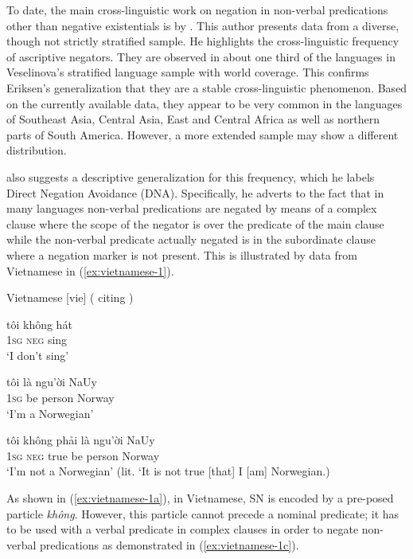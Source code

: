 \documentclass[output=paper,chinesefont,colorlinks,citecolor=brown]{langscibook}
\begin{document}
To date, the main cross-linguistic work on negation in non-verbal predications other than negative existentials is by \citet{eriksen2011}. This author presents data from a diverse, though not strictly stratified sample. He highlights the cross-linguistic frequency of ascriptive negators. They are observed in about one third of the languages in Veselinova’s stratified language sample with world coverage. This confirms Eriksen’s generalization that they are a stable cross-linguistic phenomenon. Based on the currently available data, they appear to be very common in the languages of Southeast Asia, Central Asia, East and Central Africa as well as northern parts of South America. However, a more extended sample may show a different distribution.

\citet{eriksen2011} also suggests a descriptive generalization for this frequency, which he labels Direct Negation Avoidance (DNA). Specifically, he adverts to the fact that in many languages non-verbal predications are negated by means of a complex clause where the scope of the negator is over the predicate of the main clause while the non-verbal predicate actually negated is in the subordinate clause where a negation marker is not present. This is illustrated by data from Vietnamese in (\ref{ex:vietnamese-1}).

\begin{exe}
\ex Vietnamese [vie] (\citealt[280]{eriksen2011} citing \citealt[170, 112]{Husby1991}) \label{ex:vietnamese-1}
\begin{xlist}
\ex \label{ex:vietnamese-1a}
\gll tôi không hát\\
\textsc{1sg} \textsc{neg} sing\\
\glt ‘I don’t sing’

\ex \label{ex:vietnamese-1b}
\gll tôi là ngu’ời NaUy\\
\textsc{1sg} be person Norway\\
\glt ‘I’m a Norwegian’

\ex \label{ex:vietnamese-1c}
\gll tôi không phải là ngu’ời NaUy\\
\textsc{1sg} \textsc{neg} true be person Norway\\
\glt ‘I’m not a Norwegian’ (lit. ‘It is not true [that] I [am] Norwegian.)

\end{xlist}
\end{exe}
As shown in (\ref{ex:vietnamese-1a}), in Vietnamese, SN is encoded by a pre-posed particle \textit{không}. However, this particle cannot precede a nominal predicate; it has to be used with a verbal predicate in complex clauses in order to negate non-verbal predications as demonstrated in (\ref{ex:vietnamese-1c}).
\end{document}
